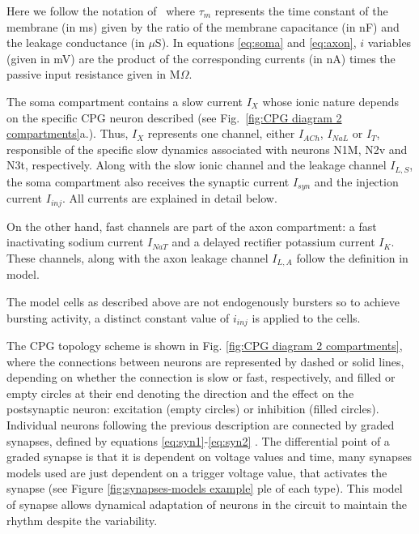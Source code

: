 \noindent Here we follow the notation of~\cite{Vavoulis2007} where $\tau_m$ represents the time constant of the membrane (in ms) given by the ratio of the membrane capacitance (in nF) and the leakage conductance (in $\mu$S).  In equations \ref{eq:soma} and \ref{eq:axon}, $i$ variables (given in mV) are the product of the corresponding currents (in nA) times the passive input resistance given in M$\Omega$.

The soma compartment contains a slow current $I_X$ whose ionic nature depends on the specific CPG neuron described (see Fig.~\ref{fig:CPG diagram 2 compartments}a.). Thus, $I_X$  represents one channel, either $I_{ACh}$, $I_{NaL}$ or $I_{T}$, responsible of the specific slow dynamics associated with neurons N1M, N2v and N3t, respectively.  Along with the slow ionic channel and the leakage channel  $I_{L,S}$, the soma compartment also receives the synaptic current $I_{syn}$ and the injection current $I_{inj}$. All currents are explained in detail below.

On the other hand, fast channels are part of the axon compartment: a fast inactivating sodium current $I_{NaT}$ and a delayed rectifier potassium current $I_{K}$. These channels, along with the axon leakage channel  $I_{L,A}$ follow the definition in \cite{HODGKIN1952} model.

The model cells as described above are not endogenously bursters so to achieve bursting activity, a distinct constant value of  \(i_{inj}\) is applied to the cells. 

The CPG topology scheme is shown in Fig. \ref{fig:CPG diagram 2 compartments}, where the connections between neurons are represented by dashed or solid lines, depending on whether the connection is slow or fast, respectively, and filled or empty circles at their end denoting the direction and the effect on the postsynaptic neuron: excitation (empty circles) or inhibition (filled circles).
Individual neurons following the previous description are connected by graded synapses, defined by equations \ref{eq:syn1}-\ref{eq:syn2} \parencite{Vavoulis2007}. The differential point of a graded synapse is that it is dependent on voltage values and time, many synapses models used are just dependent on a trigger voltage value, that activates the synapse (see Figure \ref{fig:synapses-models example} ple of each type). This model of synapse allows dynamical adaptation of neurons in the circuit to maintain the rhythm despite the variability. 

